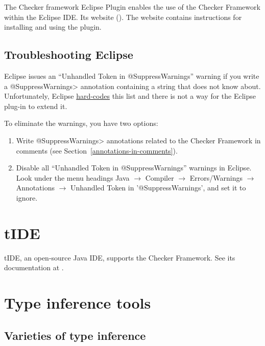 The Checker framework Eclipse Plugin enables the use of the Checker
Framework within the Eclipse IDE\@.
Its website ().
The website contains instructions for installing and using the plugin.


\subsection{Troubleshooting Eclipse}

Eclipse issues an ``Unhandled Token in @SuppressWarnings'' warning if you
write a \<@SuppressWarnings> annotation containing a string that does not
know about.  Unfortunately, Eclipse
\href{https://bugs.eclipse.org/bugs/show_bug.cgi?id=122475}{hard-codes}
this list and there is not a way for the Eclipse plug-in to extend it.

To eliminate the warnings, you have two options:

\begin{enumerate}
\item
Write \<@SuppressWarnings> annotations related to the Checker Framework in
comments (see Section~\ref{annotations-in-comments}).
\item
  Disable all ``Unhandled Token in @SuppressWarnings'' warnings in Eclipse.
  Look under the menu headings Java $\rightarrow$ Compiler $\rightarrow$ Errors/Warnings $\rightarrow$ Annotations $\rightarrow$ Unhandled Token in '@SuppressWarnings', and set it to ignore.
\end{enumerate}


\section{tIDE\label{tide}}

\begin{sloppypar}
tIDE, an open-source Java IDE, supports the Checker Framework.  See its
documentation at .
\end{sloppypar}


\section{Type inference tools\label{type-inference-tools}}

\subsection{Varieties of type inference\label{type-inference-varieties}}

